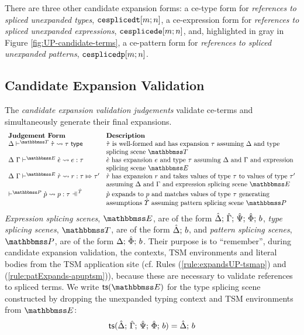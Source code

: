 {{{{There are three other candidate expansion forms: a ce-type form for \emph{references to spliced unexpanded types}, $\texttt{cesplicedt}[m; n]$, a ce-expression form for \emph{references to spliced unexpanded expressions}, $\texttt{cesplicede}[m; n]$, and, highlighted in gray in Figure \ref{fig:UP-candidate-terms}, a ce-pattern form for \emph{references to spliced unexpanded patterns}, $\texttt{cesplicedp}[m; n]$. %

\subsection{Candidate Expansion Validation}\label{sec:ce-validation-UP}
The \emph{candidate expansion validation judgements} validate ce-terms and simultaneously generate their final expansions.
\[\begin{array}{ll}
\textbf{Judgement Form} & \textbf{Description}\\
\cvalidT{\Delta}{\tscenev}{\ctau}{\tau} & \text{$\ctau$ is well-formed and has expansion $\tau$ assuming $\Delta$ and type}\\
& \text{splicing scene $\tscenev$}\\
\cvalidE{\Delta}{\Gamma}{\escenev}{\ce}{e}{\tau} & \text{$\ce$ has expansion $e$ and type $\tau$ assuming $\Delta$ and $\Gamma$ and expression}\\
& \text{splicing scene $\escenev$}\\
\cvalidR{\Delta}{\Gamma}{\escenev}{\crv}{r}{\tau}{\tau'} & \text{$\crv$ has expansion $r$ and takes values of type $\tau$ to values of type $\tau'$}\\
& \text{assuming $\Delta$ and $\Gamma$ and expression splicing scene $\escenev$}\\
\cvalidP{\upctx}{\pscenev}{\cpv}{p}{\tau} & \text{$\cpv$ expands to $p$ and matches values of type $\tau$ generating}\\
& \text{assumptions $\upctx$ assuming pattern splicing scene $\pscenev$}
\end{array}\]
\emph{Expression splicing scenes}, $\escenev$, are of the form $\hat{\Delta};\,\hat{\Gamma};\,\hat{\Psi};\,\hat\Phi;\,b$, \emph{type splicing scenes}, $\tscenev$, are of the form $\hat{\Delta};\,b$, and \emph{pattern splicing scenes}, $\pscenev$, are of the form $\Delta;\,\hat\Phi;\,b$. Their purpose is to ``remember'', during candidate expansion validation, the contexts, TSM environments and literal bodies from the TSM application site (cf. Rules (\ref{rule:expandsUP-tsmap}) and (\ref{rule:patExpands-apuptsm})), because these are necessary to validate references to spliced terms. We write $\tsfrom{\escenev}$ for the type splicing scene constructed by dropping the unexpanded typing context and TSM environments from $\escenev$:
\[\mathsf{ts}(\hat{\Delta};\,\hat{\Gamma};\,\hat{\Psi};\,\hat\Phi;\,b) = \hat{\Delta};\,b\]

}}}}
